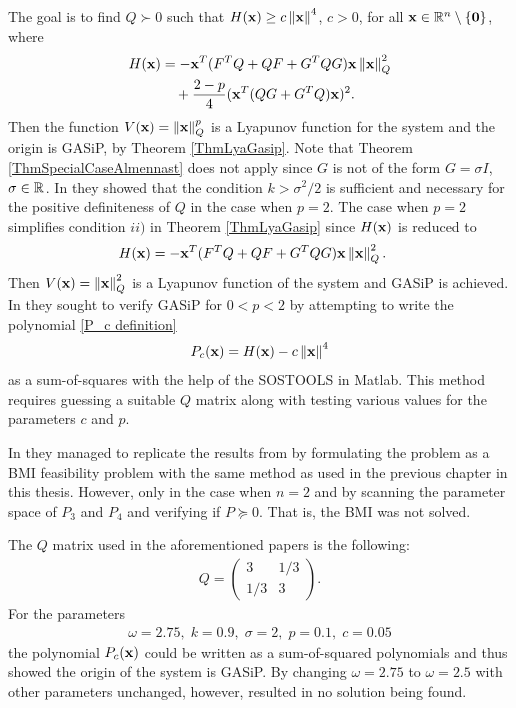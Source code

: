 \documentclass[a4paper,12pt,twoside,BCOR=10mm]{scrbook}
\begin{document}
The goal is to find $Q \succ 0$ such that $H(\mathbf{x}) \geq c\left\lVert\mathbf{x}\right\rVert^4$, $c > 0$, for all $\mathbf{x} \in \mathbb{R}^{n} \setminus \{\mathbf{0}\}$, where
\begin{align*}
\begin{split}
    H(\mathbf{x}) &= -\mathbf{x}^T (F^T Q + QF + G^TQG) \mathbf{x}\left\lVert\mathbf{x}\right\rVert_{Q}^{2}\\
    &\quad+ \frac{2 - p}{4} (\mathbf{x}^T (QG + G^TQ)\mathbf{x})^2.
\end{split}
\end{align*}
Then the function $V(\mathbf{x}) = \left\lVert\mathbf{x}\right\rVert_Q^p$ is a Lyapunov function for the system and the origin is GASiP, by Theorem \ref{ThmLyaGasip}. Note that Theorem \ref{ThmSpecialCaseAlmennast} does not apply since $G$ is not of the form $G = \sigma I$, $\sigma \in \mathbb{R}^{}$.
In \citep{sdestab2012khaminskii} they showed that the condition $k > \sigma^2 / 2$ is sufficient and necessary for the positive definiteness of $Q$ in the case when $p = 2$. The case when $p = 2$ simplifies condition $ii)$ in Theorem \ref{ThmLyaGasip} since $H(\mathbf{x})$ is reduced to
\begin{align*}
    H(\mathbf{x}) &= -\mathbf{x}^T (F^T Q + QF + G^TQG)\mathbf{x}\left\lVert\mathbf{x}\right\rVert_{Q}^{2}.
\end{align*}
Then $V(\mathbf{x}) = \left\lVert\mathbf{x}\right\rVert_{Q}^{2}$ is a Lyapunov function of the system and GASiP is achieved. In \citep{HGGS2018localLya} they sought to verify GASiP for $0 < p < 2$ by attempting to write the polynomial \eqref{P_c definition}
\begin{align*}
    P_c(\mathbf{x}) = H(\mathbf{x}) - c\left\lVert\mathbf{x}\right\rVert_{}^{4}
\end{align*}
as a sum-of-squares with the help of the SOSTOOLS in Matlab. This method requires guessing a suitable $Q$ matrix along with testing various values for the parameters $c$ and $p$.

In \citep{Ha2019BMI} they managed to replicate the results from \citep{HGGS2018localLya} by formulating the problem as a BMI feasibility problem with the same method as used in the previous chapter in this thesis. However, only in the case when $n = 2$ and by scanning the parameter space of $P_3$ and $P_4$ and verifying if $P \succeq 0$. That is, the BMI was not solved.

The $Q$ matrix used in the aforementioned papers is the following:
\begin{align*}
    Q = \begin{pmatrix}
    3 & 1/3\\
    1/3 & 3
    \end{pmatrix}.
\end{align*}
For the parameters
\begin{align*}
    \omega = 2.75,\; k = 0.9, \; \sigma = 2, \; p = 0.1 , \; c = 0.05
\end{align*}
the polynomial $P_c(\mathbf{x})$ could be written as a sum-of-squared polynomials and thus showed the origin of the system is GASiP. By changing $\omega = 2.75$ to $\omega = 2.5$ with other parameters unchanged, however, resulted in no solution being found.
\end{document}
